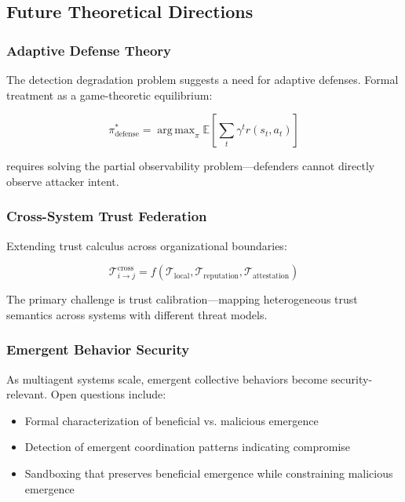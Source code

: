 \documentclass[
]{article}
\DeclareMathOperator*{\argmax}{arg\,max}
\begin{document}
\subsection{Future Theoretical Directions}\label{sec:future-directions}

\subsubsection{Adaptive Defense Theory}\label{adaptive-defense-theory}

The detection degradation problem suggests a need for adaptive defenses.
Formal treatment as a game-theoretic equilibrium:

\begin{equation}
\label{eq:adaptive-defense}
\pi^{*}_{\text{defense}} = \argmax_{\pi} \mathbb{E}\left[\sum_t \gamma^t r(s_t, a_t)\right]
\end{equation}

requires solving the partial observability problem---defenders cannot
directly observe attacker intent.

\subsubsection{Cross-System Trust
Federation}\label{cross-system-trust-federation}

Extending trust calculus across organizational boundaries:

\begin{equation}
\label{eq:cross-system-trust}
\mathcal{T}_{i \to j}^{\text{cross}} = f(\mathcal{T}_{\text{local}}, \mathcal{T}_{\text{reputation}}, \mathcal{T}_{\text{attestation}})
\end{equation}

The primary challenge is trust calibration---mapping heterogeneous trust
semantics across systems with different threat models.

\subsubsection{Emergent Behavior
Security}\label{emergent-behavior-security}

As multiagent systems scale, emergent collective behaviors become
security-relevant. Open questions include:

\begin{itemize}
\item Formal characterization of beneficial vs. malicious emergence
\item Detection of emergent coordination patterns indicating compromise
\item Sandboxing that preserves beneficial emergence while constraining malicious emergence
\end{itemize}
\end{document}
